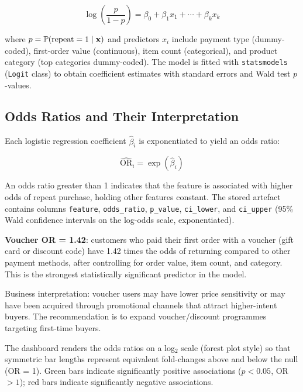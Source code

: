 \begin{equation}
\log\!\left(\frac{p}{1-p}\right) = \beta_0 + \beta_1 x_1 + \cdots + \beta_k x_k
\label{eq:logistic}
\end{equation}

where $p = \operatorname{\mathbb{P}}(\text{repeat} = 1 \mid \mathbf{x})$ and predictors $x_i$
include payment type (dummy-coded), first-order value (continuous), item count
(categorical), and product category (top categories dummy-coded). The model is
fitted with \texttt{statsmodels} (\texttt{Logit} class) to obtain coefficient
estimates with standard errors and Wald test $p$-values.

\subsection{Odds Ratios and Their Interpretation}

Each logistic regression coefficient $\hat{\beta}_i$ is exponentiated to yield
an odds ratio:

\begin{equation}
\widehat{\text{OR}}_i = \exp(\hat{\beta}_i)
\label{eq:odds-ratio}
\end{equation}

An odds ratio greater than 1 indicates that the feature is associated with
higher odds of repeat purchase, holding other features constant. The stored
artefact  contains
columns \texttt{feature}, \texttt{odds\_ratio}, \texttt{p\_value},
\texttt{ci\_lower}, and \texttt{ci\_upper} (95\% Wald confidence intervals on
the log-odds scale, exponentiated).

\begin{keyinsight}
\textbf{Voucher OR = 1.42}: customers who paid their first order with a voucher
(gift card or discount code) have 1.42 times the odds of returning compared to
other payment methods, after controlling for order value, item count, and
category. This is the strongest statistically significant predictor in the model.

Business interpretation: voucher users may have lower price sensitivity or may
have been acquired through promotional channels that attract higher-intent buyers.
The recommendation is to expand voucher/discount programmes targeting first-time
buyers.
\end{keyinsight}

The dashboard renders the odds ratios on a log$_2$ scale (forest plot style)
so that symmetric bar lengths represent equivalent fold-changes above and below
the null (OR = 1). Green bars indicate significantly positive associations
($p < 0.05$, OR $> 1$); red bars indicate significantly negative associations.

